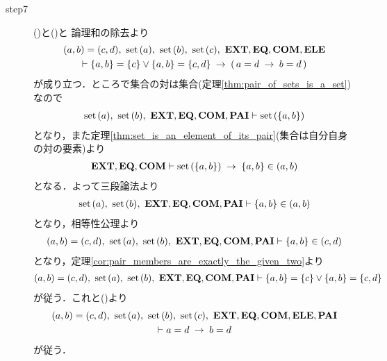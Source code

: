 \begin{sketch}
\begin{description}
			\item[step7] ()と()と
				論理和の除去より
				\begin{align}
					\begin{gathered}
						(a,b) = (c,d),\ \set{a},\ \set{b},\ \set{c},\ \EXTAX,\EQAX,\COMAX,\ELEAX \\
						\vdash \{a,b\} = \{c\} \vee \{a,b\} = \{c,d\} \rarrow (\, a = d \rarrow b = d\, )
					\end{gathered}
					\label{fom:equality_of_ordered_pairs_13}
				\end{align}
				が成り立つ．ところで集合の対は集合(定理\ref{thm:pair_of_sets_is_a_set})なので
				\begin{align}
					\operatorname*{set}\hspace{0.15em}(a),\ \operatorname*{set}\hspace{0.15em}(b),\ \mbox{{\bf EXT}},\mbox{{\bf EQ}},\mbox{\bf COM},\mbox{{\bf PAI}} \vdash \operatorname*{set}\hspace{0.15em}(\{a,b\})
				\end{align}
				となり，また定理\ref{thm:set_is_an_element_of_its_pair}(集合は自分自身の対の要素)より
				\begin{align}
					\mbox{{\bf EXT}},\mbox{{\bf EQ}},\mbox{\bf COM} \vdash \operatorname*{set}\hspace{0.15em}(\{a,b\}) \hspace{0.25em}\rightarrow\hspace{0.25em} \{a,b\} \in (a,b)	
				\end{align}
				となる．よって三段論法より
				\begin{align}
					\operatorname*{set}\hspace{0.15em}(a),\ \operatorname*{set}\hspace{0.15em}(b),\ \mbox{{\bf EXT}},\mbox{{\bf EQ}},\mbox{\bf COM},\mbox{{\bf PAI}} \vdash \{a,b\} \in (a,b)
				\end{align}
				となり，相等性公理より
				\begin{align}
					(a,b) = (c,d),\ \set{a},\ \set{b},\ \EXTAX,\EQAX,\COMAX,\PAIAX \vdash \{a,b\} \in (c,d)
				\end{align}
				となり，定理\ref{cor:pair_members_are_exactly_the_given_two}より
				\begin{align}
					(a,b) = (c,d),\ \set{a},\ \set{b},\ \EXTAX,\EQAX,\COMAX,\PAIAX 
					\vdash \{a,b\} = \{c\} \vee \{a,b\} = \{c,d\}
				\end{align}
				が従う．これと()より
				\begin{align}
					\begin{gathered}
						(a,b) = (c,d),\ \set{a},\ \set{b},\ \set{c},\ \EXTAX,\EQAX,\COMAX,\ELEAX,\PAIAX \\
						\vdash a = d \rarrow b = d
					\end{gathered}
					\label{fom:equality_of_ordered_pairs_14}
				\end{align}
				が従う．
				

\end{description}
\end{sketch}
